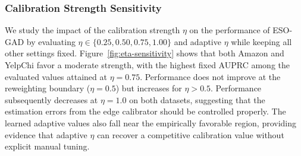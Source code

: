 \begin{table}[t]
\centering
\caption{Comparison between different aggregator gate choices to produce the representation $\bm Z$ from different filter bands. %
}
\label{tab:rq6-main}
\end{table}


\subsubsection{Calibration Strength Sensitivity}
We study the impact of the calibration strength $\eta$ on the performance of ESO-GAD by evaluating $\eta\in\{0.25,0.50,0.75,1.00\}$ and adaptive $\eta$ while keeping all other settings fixed.
Figure~\ref{fig:eta-sensitivity} shows that both Amazon and YelpChi favor a moderate strength, with the highest fixed AUPRC among the evaluated values attained at $\eta=0.75$.
Performance does not improve at the reweighting boundary ($\eta=0.5$) but increases for $\eta>0.5$.
Performance subsequently decreases at $\eta=1.0$ on both datasets, suggesting that the estimation errors from the edge calibrator should be controlled properly.
The learned adaptive values also fall near the empirically favorable region, providing evidence that adaptive $\eta$ can recover a competitive calibration value without explicit manual tuning.


